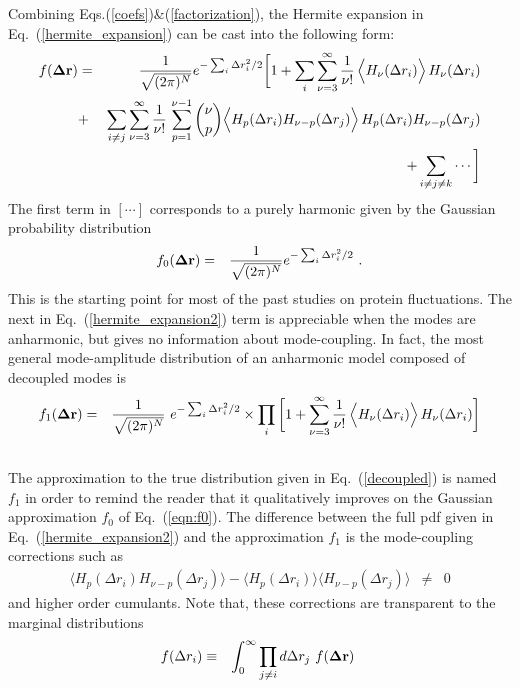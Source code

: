 \documentclass{article}
\begin{document}
Combining Eqs.(\ref{coefs})\&(\ref{factorization}), the Hermite
expansion in Eq.~(\ref{hermite_expansion}) can be cast into the
following form:
\begin{eqnarray}
\label{hermite_expansion2}
f({\bf\Delta r}) &=& \frac{1}{\sqrt{(2\pi)^N}} e^{ -\sum_i \Delta
  r_i^2/2} \bigg[ 1 + \sum_i\sum_{\nu=3}^\infty
  \frac{1}{\nu!}\, \Big\langle
  H_\nu(\Delta r_i)\Big\rangle\,H_\nu(\Delta r_i) \nonumber \\
&+&  \sum_{i\ne j}\sum_{\nu=3}^\infty
  \frac{1}{\nu!}\,\sum_{p=1}^{\nu-1} {\nu\choose p} \Big\langle
  H_p(\Delta r_i)H_{\nu-p}(\Delta r_j)\Big\rangle\,H_p(\Delta r_i)H_{\nu-p}(\Delta r_j) \nonumber \\
&& + \sum_{i\ne j\ne k} \cdots \bigg]
\end{eqnarray}
The first term in $[\cdots]$ corresponds to a purely harmonic given by
the Gaussian probability distribution
\begin{eqnarray}
\label{eqn:f0}
f_0({\bf\Delta r}) &=& \frac{1}{\sqrt{(2\pi)^N}} e^{ -\sum_i \Delta
  r_i^2/2}\ .
\end{eqnarray}
This is the starting point for most of the past studies on protein
fluctuations\cite{}. The next in Eq.~(\ref{hermite_expansion2}) term is
appreciable when the modes are anharmonic, but gives no information
about mode-coupling. In fact, the most general mode-amplitude
distribution of an anharmonic model composed of decoupled modes is
\begin{eqnarray}
\label{decoupled}
f_1({\bf\Delta r}) &=& \frac{1}{\sqrt{(2\pi)^N}}\ e^{ -\sum_i \Delta
  r_i^2/2}\times \prod_i \bigg[ 1 + \sum_{\nu=3}^\infty
  \frac{1}{\nu!}\, \Big\langle
  H_\nu(\Delta r_i)\Big\rangle\,H_\nu(\Delta r_i)\bigg] \nonumber \\
&&
\end{eqnarray}
The approximation to the true distribution given in
Eq.~(\ref{decoupled}) is named $f_1$ in order to remind the reader
that it qualitatively improves on the Gaussian approximation $f_0$
of Eq.~(\ref{eqn:f0}). The difference between the full pdf given in
Eq.~(\ref{hermite_expansion2}) and the approximation $f_1$ is the
mode-coupling corrections such as
\begin{eqnarray}
\langle H_p(\Delta r_i)H_{\nu-p}(\Delta r_j)\rangle - \langle
H_p(\Delta r_i)\rangle\langle H_{\nu-p}(\Delta r_j)\rangle &\neq& 0 \nonumber
\end{eqnarray}
and higher order cumulants. Note that, these corrections are transparent to the
marginal distributions
\begin{eqnarray}
\label{marginal}
f(\Delta r_i) &\equiv& \int_0^\infty \prod_{j\ne i}d\Delta r_j\ f({\bf\Delta r})\ 
\end{eqnarray}
\end{document}

